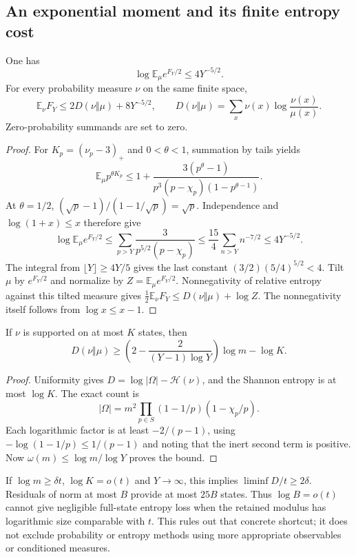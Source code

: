 \subsection{An exponential moment and its finite entropy cost}
\begin{theorem}\label{om-transfer}
One has
\[
 \log\mathbb E_\mu e^{F_Y/2}\le4Y^{-5/2}.
\]
For every probability measure $\nu$ on the same finite space,
\[
 \mathbb E_\nu F_Y\le2D(\nu\Vert\mu)+8Y^{-5/2},
 \qquad
 D(\nu\Vert\mu)=\sum_x\nu(x)\log\frac{\nu(x)}{\mu(x)}.
\]
Zero-probability summands are set to zero.
\end{theorem}
\begin{proof}
For $K_p=(\nu_p-3)_+$ and $0<\theta<1$, summation by tails yields
\[
 \mathbb E_\mu p^{\theta K_p}
 \le1+\frac{3(p^\theta-1)}
 {p^3(p-\chi_p)(1-p^{\theta-1})}.
\]
At $\theta=1/2$, $(\sqrt p-1)/(1-1/\sqrt p)=\sqrt p$.
Independence and $\log(1+x)\le x$ therefore give
\[
 \log\mathbb E_\mu e^{F_Y/2}
 \le\sum_{p>Y}\frac3{p^{5/2}(p-\chi_p)}
 \le\frac{15}4\sum_{n>Y}n^{-7/2}\le4Y^{-5/2}.
\]
The integral from $\lfloor Y\rfloor\ge4Y/5$ gives the last constant
$(3/2)(5/4)^{5/2}<4$. Tilt $\mu$ by $e^{F_Y/2}$ and normalize by
$Z=\mathbb E_\mu e^{F_Y/2}$. Nonnegativity of relative entropy against
this tilted measure gives $\frac12\mathbb E_\nu F_Y\le D(\nu\Vert\mu)+\log Z$.
The nonnegativity itself follows from $\log x\le x-1$.
\end{proof}

\begin{theorem}\label{om-cardinality}
If $\nu$ is supported on at most $K$ states, then
\[
 D(\nu\Vert\mu)\ge
 \left(2-\frac2{(Y-1)\log Y}\right)\log m-\log K.
\]
\end{theorem}
\begin{proof}
Uniformity gives $D=\log|\Omega|-\mathcal H(\nu)$, and the Shannon entropy
is at most $\log K$. The exact count is
\[
 |\Omega|=m^2\prod_{p\in S}(1-1/p)(1-\chi_p/p).
\]
Each logarithmic factor is at least $-2/(p-1)$, using
$-\log(1-1/p)\le1/(p-1)$ and noting that the inert second term is positive.
Now $\omega(m)\le\log m/\log Y$ proves the bound.
\end{proof}
If $\log m\ge\delta t$, $\log K=o(t)$ and $Y\to\infty$, this implies
$\liminf D/t\ge2\delta$. Residuals of norm at most $B$ provide at most
$25B$ states. Thus $\log B=o(t)$ cannot give negligible full-state entropy
loss when the retained modulus has logarithmic size comparable with $t$.
This rules out that concrete shortcut; it does not exclude probability or
entropy methods using more appropriate observables or conditioned measures.

